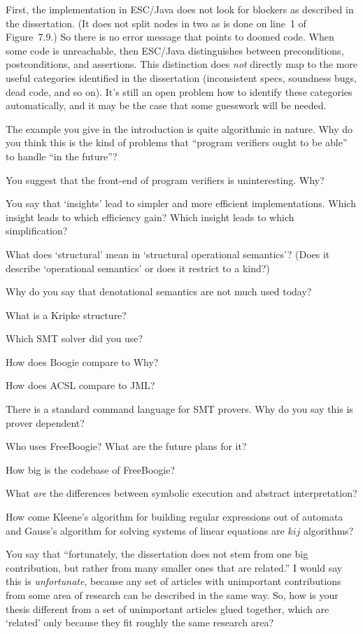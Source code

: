 \A First, the implementation in ESC/Java does not look for blockers as
described in the dissertation. (It does not split nodes in two as is done
on line~1 of Figure~7.9.) So there is no error message that points to
doomed code. When some code is unreachable, then ESC/Java distinguishes
between preconditions, postconditions, and assertions. This distinction
does {\it not\/} directly map to the more useful categories identified in
the dissertation (inconsistent specs, soundness bugs, dead code, and so
on).  It's still an open problem how to identify these categories
automatically, and it may be the case that some guesswork will be needed.

\Q The example you give in the introduction is quite algorithmic in nature.
Why do you think this is the kind of problems that ``program verifiers
ought to be able'' to handle ``in the future''?

\Q You suggest that the front-end of program verifiers is uninteresting.
Why?

\Q You say that `insights' lead to simpler and more efficient
implementations.  Which insight leads to which efficiency gain? Which
insight leads to which simplification?

\Q What does `structural' mean in `structural operational semantics'?
(Does it describe `operational semantics' or does it restrict to a kind?)

\Q Why do you say that denotational semantics are not much used today?

\Q What is a Kripke structure?

\Q Which SMT solver did you use?

\Q How does Boogie compare to Why?

\Q How does ACSL compare to JML?

\Q There is a standard command language for SMT provers. Why do you say
this is prover dependent?

\Q Who uses FreeBoogie? What are the future plans for it?

\Q How big is the codebase of FreeBoogie?

\Q What {\it are\/} the differences between symbolic execution and abstract
interpretation?

\Q How come Kleene's algorithm for building regular expressions out of
automata and Gauss's algorithm for solving systems of linear equations are
$kij$ algorithms?

\Q You say that ``fortunately, the dissertation does not stem from one big
contribution, but rather from many smaller ones that are related.'' I would
say this is {\it unfortunate}, because any set of articles with unimportant
contributions from some area of research can be described in the same way.
So, how is your thesis different from a set of unimportant articles glued
together, which are `related' only because they fit roughly the same
research area?

